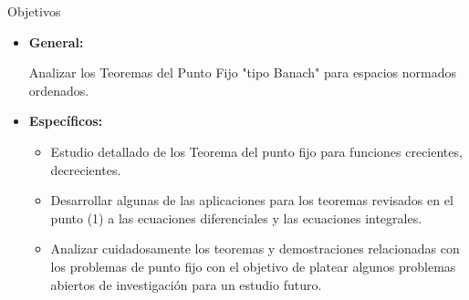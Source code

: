 \begin{frame}[t,fragile]{}
\begin{block}{}
	\centering
	\Huge\textcolor{Azul}{Objetivos} 
	
\end{block}

\begin{itemize}
	\item \textbf{General:}
	\begin{exampleblock}{}
	
	Analizar los Teoremas del Punto Fijo "tipo Banach" para espacios normados ordenados.
	\end{exampleblock}
	\item \textbf{Específicos:}
	\begin{itemize}
		\item[$ \ast $] 	Estudio detallado de los Teorema del punto fijo para funciones crecientes, decrecientes.
		\item[$ \ast $] Desarrollar algunas  de las aplicaciones para los teoremas revisados en el punto (1) a las ecuaciones diferenciales y las ecuaciones integrales.
		\item[$ \ast $] Analizar cuidadosamente los teoremas y demostraciones relacionadas con los problemas de punto fijo con el objetivo de platear algunos problemas abiertos de investigación para un estudio futuro.
	\end{itemize}

\end{itemize}



\end{frame}